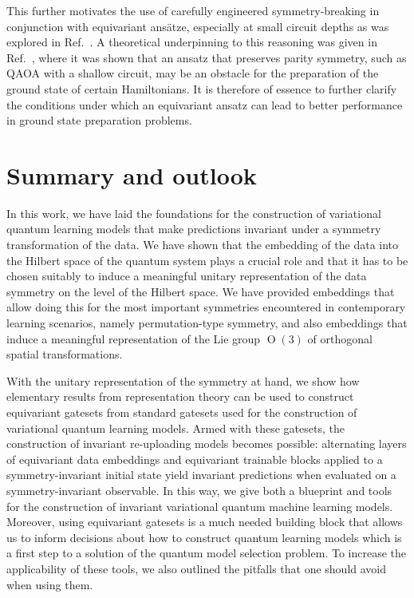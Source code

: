 \documentclass[a4paper,twocolumn,notitlepage,nofootinbib,superscriptaddress,floatfix]{revtex4-2}
\renewcommand{\O}{\ensuremath{\operatorname{O}}}
\begin{document}
This further motivates the use of carefully engineered symmetry-breaking in conjunction with equivariant ansätze, especially at small circuit depths as was explored in Ref.~\cite{ParkBrokenSymm}. A theoretical underpinning to this reasoning was given in Ref.~\cite{Bravyi_2020}, where it was shown that an ansatz that preserves parity symmetry, such as QAOA with a shallow circuit, may be an obstacle for the preparation of the ground state of certain Hamiltonians. It is therefore of essence to further clarify the conditions under which an equivariant ansatz can lead to better performance in ground state preparation problems.


\section{Summary and outlook} 

In this work, we have laid the foundations for the construction of variational quantum learning models that make predictions invariant under a symmetry transformation of the data. 
We have shown that the embedding of the data into the Hilbert space of the quantum system plays a crucial role and that it has to be chosen suitably to induce a meaningful unitary representation of the data symmetry on the level of the Hilbert space. We %
have provided embeddings that allow doing this for the most important symmetries encountered in contemporary learning scenarios, namely permutation-type symmetry, and also %
embeddings that induce a meaningful representation of the Lie group $\O(3)$ of orthogonal spatial transformations. 

With the unitary representation of the symmetry at hand, we show how elementary results from representation theory can be used to construct equivariant gatesets from standard gatesets used for the construction of variational quantum learning models. Armed with these gatesets, the construction of invariant re-uploading models becomes possible: alternating layers of equivariant data embeddings and equivariant trainable blocks applied to a symmetry-invariant initial state yield invariant predictions when evaluated on a symmetry-invariant observable. In this way, we give both a blueprint and tools for the construction of invariant variational quantum machine learning models. Moreover, using equivariant gatesets is a much needed building block that allows us to inform decisions about how to construct quantum learning models which is a first step to a solution of the quantum model selection problem. To increase the applicability of these tools, we also outlined the pitfalls that one should avoid when using them.
\end{document}
